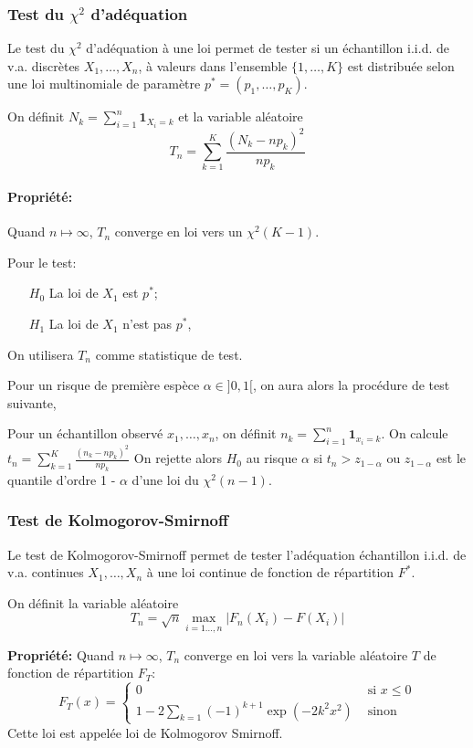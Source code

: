 \subsubsection{Test du $\chi^2$ d'adéquation}

Le test du $\chi^2$ d'adéquation à une loi permet de tester si un échantillon i.i.d. de v.a. discrètes $X_1,\dots, X_n$, à valeurs dans l'ensemble $\lbrace 1,\dots, K\rbrace$ est distribuée selon une loi multinomiale de paramètre $p^* = (p_1,\dots ,p_K)$.

On définit $N_k = \sum_{i = 1}^n \mathbf{1}_{X_i = k}$ et la variable aléatoire
$$T_n = \sum_{k = 1}^K\frac{(N_k - np_k)^2}{np_k}$$
\paragraph{Propriété: }Quand $n\mapsto \infty$, $T_n$ converge en loi vers un $\chi^2(K - 1)$.
\medskip

Pour le test:
\begin{itemize}
\item[$H_0$] La loi de $X_1$ est $p^*$;
\item[$H_1$] La loi de $X_1$ n'est pas $p^*$,
\end{itemize}
On utilisera $T_n$ comme statistique de test.

Pour un risque de première espèce $\alpha \in ]0, 1[$, 
on aura alors la procédure de test suivante, 

Pour un échantillon observé $x_1,\dots, x_n$, on définit $n_k =  \sum_{i = 1}^n \mathbf{1}_{x_i = k}$. On calcule 
$t_n = \sum_{k = 1}^K\frac{(n_k - np_k)^2}{np_k}$
On rejette alors $H_0$ au risque $\alpha$ si $t_n > z_{1 - \alpha}$ ou $z_{1 - \alpha}$ est le quantile d'ordre 1 - $\alpha$ d'une loi du $\chi^2(n-1)$. 


\subsubsection{Test de Kolmogorov-Smirnoff}

Le test de Kolmogorov-Smirnoff permet de tester l'adéquation échantillon i.i.d. de v.a. continues $X_1,\dots, X_n$ à une loi continue de fonction de répartition $F^*$.

On définit la variable aléatoire
$$T_n = \sqrt{n} \max_{i = 1\dots, n} \vert F_n(X_i) - F(X_i)\vert$$

\textbf{Propriété: }Quand $n\mapsto \infty$, $T_n$ converge en loi vers la variable aléatoire $T$ de fonction de répartition $F_T:$
$$F_T(x) = \left\lbrace 
\begin{array}{lr}
0 & \text{ si } x\leq 0\\
1 - 2 \sum_{k = 1} (-1)^{k + 1} \exp\left(-2 k^2 x^2 \right)& \text{ sinon}
\end{array}
\right.$$
Cette loi est appelée loi de Kolmogorov Smirnoff.



